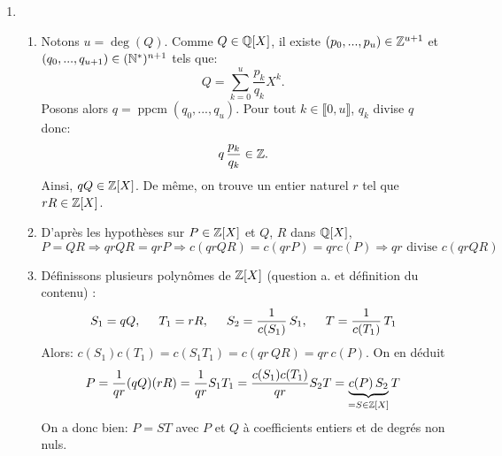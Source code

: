 \begin{enumerate}
 \item 
   \begin{enumerate}
    \item Notons $u=\deg (Q)$. Comme $Q \in \mathbb{Q}[X]$, il existe $(p_{0}, ..., p_{u})\in \mathbb{Z}^{u+1}$ et $(q_{0},...,q_{u+1})\in (\mathbb{N}^{*})^{n+1}$ tels que:
\begin{displaymath}
  Q = \sum_{k=0}^{u}\frac{p_{k}}{q_{k}}X^{k}.
\end{displaymath}
Posons alors $q = \operatorname{ppcm}(q_{0},...,q_{u})$. Pour tout $k\in \llbracket 0, u\rrbracket$, $q_{k}$ divise $q$ donc:
\[ 
q\, \frac{p_{k}}{q_{k}} \in \mathbb{Z}. 
\]
Ainsi, $qQ\in \mathbb{Z}[X]$.  De même, on trouve un entier naturel $r$ tel que $rR\in \mathbb{Z}[X]$. 
    \item D'après les hypothèses sur $P\in \mathbb{Z}[X]$ et $Q$, $R$ dans $\mathbb{Q}[X]$,
\begin{displaymath}
P = QR \Rightarrow qr QR = qr P \Rightarrow c(qrQR) = c(qrP) = qrc(P) \Rightarrow qr \text{ divise } c(qrQR)
\end{displaymath}
    \item Définissons plusieurs polynômes de $\mathbb{Z}[X]$ (question a. et définition du contenu) :
\begin{displaymath}
S_{1} = qQ,\hspace{0.5cm} T_{1} = rR,\hspace{0.5cm}
S_2 = \frac{1}{c(S_{1})}\, S_{1},\hspace{0.5cm}
T = \frac{1}{c(T_{1})}\, T_{1}
\end{displaymath}
Alors: $c(S_{1})c(T_{1}) = c(S_{1}T_{1}) = c(qr\,QR) = qr\,c(P)$. On en déduit
\begin{displaymath}
P = \frac{1}{qr} (qQ)(rR) = \frac{1}{qr}S_{1}T_{1} = \frac{c(S_{1})c(T_{1})}{qr}S_2T
= \underset{ = S \in \mathbb{Z}[X]}{\underbrace{c(P)\, S_{2}}}\,T  
\end{displaymath}
On a donc bien: $P = ST$ avec $P$ et $Q$ à coefficients entiers et de degrés non nuls.
  \end{enumerate}
\end{enumerate}

